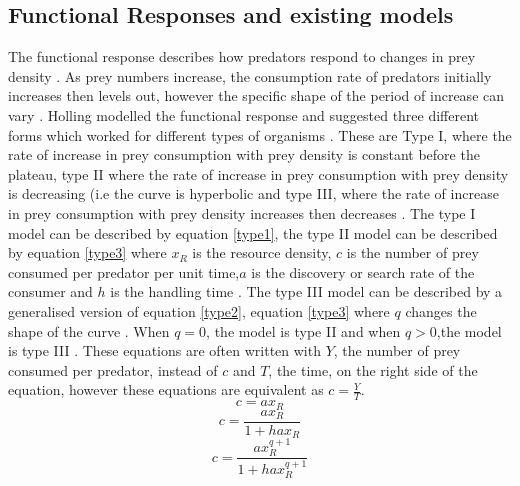 \documentclass{article}
\begin{document}
\subsection{Functional Responses and existing models}
The functional response describes how predators respond to changes in prey density \cite{hollingsawfly1959,Solomon1949}. As prey numbers increase, the consumption rate of predators initially increases then levels out, however the specific shape of the period of increase can vary \cite{hollingsawfly1959}. Holling modelled the functional response and suggested three different forms which worked for different types of organisms \cite{hollingsawfly1959}. These are Type I, where the rate of increase in prey consumption with prey density is constant before the plateau, type II where the rate of increase in prey consumption with prey density is decreasing (i.e the curve is hyperbolic %
and type III, where the  rate of increase in prey consumption with prey density increases then decreases \cite{hollingsawfly1959}. The type I model can be described by equation \ref{type1}, the type II model can be described by equation \ref{type3} where $x_R$ is the resource density, $c$ is the number of prey consumed per predator per unit time,$a$ is the discovery or search rate of the consumer and $h$ is the handling time \cite{Dawes2013,Holling1959}. The type III model can be described by a generalised version of equation \ref{type2}, equation \ref{type3} where $q$ changes the shape of the curve \cite{Dawes2013}. %
When $q=0$, the model is type II and when $q>0$,the model is type III \cite{Dawes2013}. These equations are often written with $Y$, the number of prey consumed per predator, instead of $c$ and $T$, the time, on the right side of the equation, however these equations are equivalent as $c=\frac{Y}{T}$.%
\begin{equation}\label{type1}
    c=ax_R
\end{equation}
\begin{equation}\label{type2}
c=\frac{ax_R}{1+hax_R}
\end{equation}
\begin{equation}\label{type3}
c=\frac{ax_R^{q+1}}{1+hax_R^{q+1}}
\end{equation}
\end{document}
